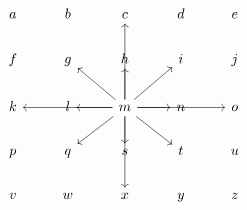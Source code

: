 \documentclass{article}
\begin{document}
\[
\begin{tikzcd}
a&b&c&d&e\\
f&g&h&i&j\\
k&l&m \arrow[r] \ar[l] \arrow[u] \arrow[d] \arrow[ur] \arrow[ul] \arrow[dr] \arrow[dl] \arrow[rr] \arrow[ll] \arrow[dd] \arrow[uu]&n&o\\
p&q&s&t&u\\
v&w&x&y&z
\end{tikzcd}
\]
\end{document}
